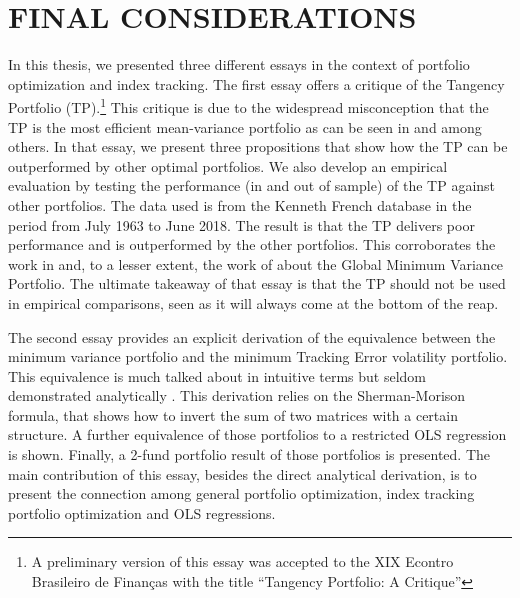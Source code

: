 \documentclass[12pt,oneside,a4paper]{memoir}
\begin{document}
\chapter{FINAL CONSIDERATIONS}

In this thesis, we presented three different essays in the context of portfolio optimization and index tracking.
The first essay offers a critique of the Tangency Portfolio (TP).\footnote{A preliminary version of this essay was accepted to the XIX Econtro Brasileiro de Finanças with the title ``Tangency Portfolio: A Critique''}
This critique is due to the widespread misconception that the TP is the most efficient mean-variance portfolio as can be seen in  and  among others.
In that essay, we present three propositions that show how the TP can be outperformed by other optimal portfolios.
We also develop an empirical evaluation by testing the performance (in and out of sample) of the TP against other portfolios.
The data used is from the Kenneth French database in the period from July 1963 to June 2018.
The result is that the TP delivers poor performance and is outperformed by the other portfolios.
This corroborates the work in  and, to a lesser extent, the work of  about the Global Minimum Variance Portfolio.
The ultimate takeaway of that essay is that the TP should not be used in empirical comparisons, seen as it will always come at the bottom of the reap.

The second essay provides an explicit derivation of the equivalence between the minimum variance portfolio and the minimum Tracking Error volatility portfolio.
This equivalence is much talked about in intuitive terms but seldom demonstrated analytically \cite{liu-2009, demol2016}.
This derivation relies on the Sherman-Morison formula, that shows how to invert the sum of two matrices with a certain structure.
A further equivalence of those portfolios to a restricted OLS regression is shown.
Finally, a 2-fund portfolio result of those portfolios is presented.
The main contribution of this essay, besides the direct analytical derivation, is to present the connection among general portfolio optimization, index tracking portfolio optimization and OLS regressions.
\end{document}
